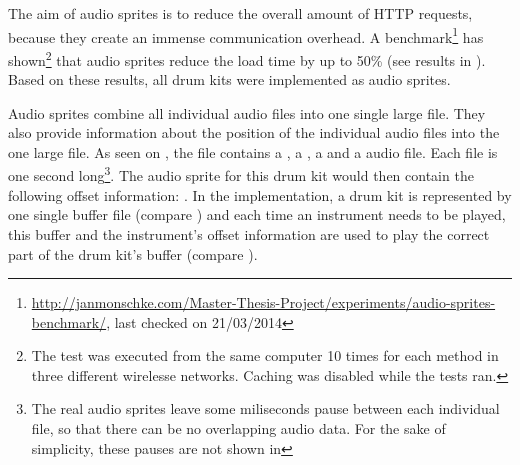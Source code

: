 The aim of audio sprites is to reduce the overall amount of HTTP requests, because they create an immense communication overhead. A benchmark\footnote{\url{http://janmonschke.com/Master-Thesis-Project/experiments/audio-sprites-benchmark/}, last checked on 21/03/2014} has shown\footnote{The test was executed from the same computer 10 times for each method in three different wirelesse networks. Caching was disabled while the tests ran.} that audio sprites reduce the load time by up to 50\% (see results in ). Based on these results, all drum kits were implemented as audio sprites.

Audio sprites combine all individual audio files into one single large file. They also provide information about the position of the individual audio files into the one large file. As seen on , the file  contains a , a , a  and a  audio file. Each file is one second long\footnote{The real audio sprites leave some miliseconds pause between each individual file, so that there can be no overlapping audio data. For the sake of simplicity, these pauses are not shown in }. The audio sprite for this drum kit would then contain the following offset information: . In the implementation, a drum kit is represented by one single buffer file (compare ) and each time an instrument needs to be played, this buffer and the instrument's offset information are used to play the correct part of the drum kit's buffer (compare ).